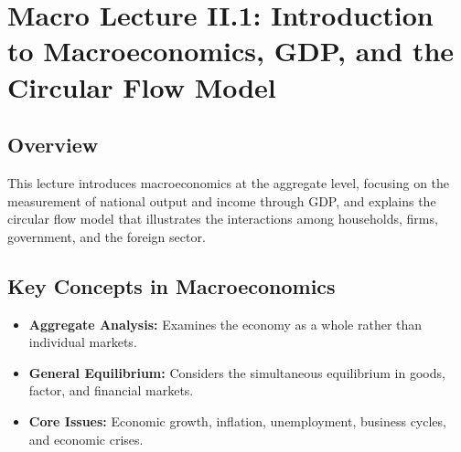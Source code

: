 \chapter*{Macro Lecture II.1: Introduction to Macroeconomics, GDP, and the Circular Flow Model}
\section*{Overview}
This lecture introduces macroeconomics at the aggregate level, focusing on the measurement of national output and income through GDP, and explains the circular flow model that illustrates the interactions among households, firms, government, and the foreign sector.

\section*{Key Concepts in Macroeconomics}
\begin{itemize}
    \item \textbf{Aggregate Analysis:} Examines the economy as a whole rather than individual markets.
    \item \textbf{General Equilibrium:} Considers the simultaneous equilibrium in goods, factor, and financial markets.
    \item \textbf{Core Issues:} Economic growth, inflation, unemployment, business cycles, and economic crises.
\end{itemize}

